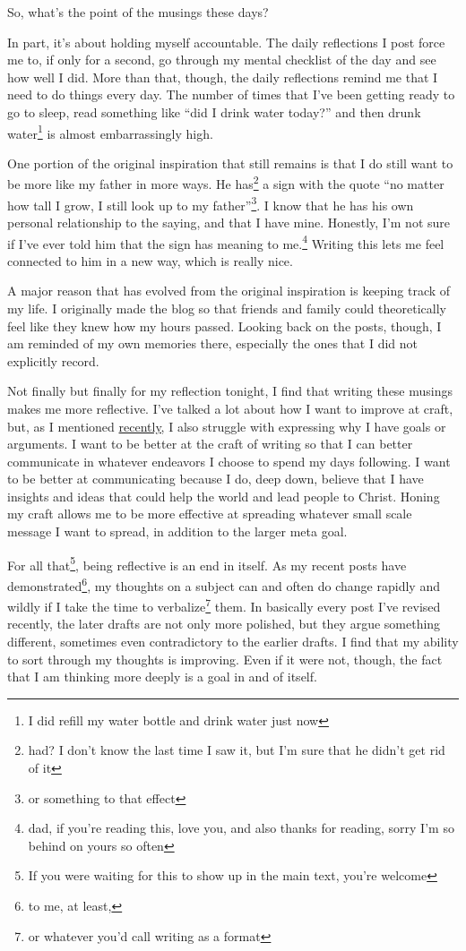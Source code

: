 \documentclass[12pt]{article}[titlepage]
\newcommand{\say}[1]{``#1''}
\newcommand{\1}{\={a}}
\newcommand{\2}{\={e}}
\newcommand{\3}{\={\i}}
\newcommand{\4}{\=o}
\newcommand{\5}{\=u}
\newcommand{\6}{\={A}}
\renewcommand{\,}{\textsuperscript{,}}
\begin{document}
So, what's the point of the musings these days?

In part, it's about holding myself accountable.
The daily reflections I post force me to, if only for a second, go through my mental checklist of the day and see how well I did.
More than that, though, the daily reflections remind me that I need to do things every day.
The number of times that I've been getting ready to go to sleep, read something like \say{did I drink water today?} and then drunk water\footnote{I did refill my water bottle and drink water just now} is almost embarrassingly high.

One portion of the original inspiration that still remains is that I do still want to be more like my father in more ways.
He has\footnote{had? I don't know the last time I saw it, but I'm sure that he didn't get rid of it} a sign with the quote \say{no matter how tall I grow, I still look up to my father}\footnote{or something to that effect}.
I know that he has his own personal relationship to the saying, and that I have mine.
Honestly, I'm not sure if I've ever told him that the sign has meaning to me.\footnote{dad, if you're reading this, love you, and also thanks for reading, sorry I'm so behind on yours so often}
Writing this lets me feel connected to him in a new way, which is really nice.

A major reason that has evolved from the original inspiration is keeping track of my life.
I originally made the blog so that friends and family could theoretically feel like they knew how my hours passed.
Looking back on the posts, though, I am reminded of my own memories there, especially the ones that I did not explicitly record.

Not finally but finally for my reflection tonight, I find that writing these musings makes me more reflective.
I've talked a lot about how I want to improve at craft, but, as I mentioned \href{conclusions.html}{recently,} I also struggle with expressing why I have goals or arguments.
I want to be better at the craft of writing so that I can better communicate in whatever endeavors I choose to spend my days following.
I want to be better at communicating because I do, deep down, believe that I have insights and ideas that could help the world and lead people to Christ.
Honing my craft allows me to be more effective at spreading whatever small scale message I want to spread, in addition to the larger meta goal.

For all that\footnote{If you were waiting for this to show up in the main text, you're welcome}, being reflective is an end in itself.
As my recent posts have demonstrated\footnote{to me, at least,}, my thoughts on a subject can and often do change rapidly and wildly if I take the time to verbalize\footnote{or whatever you'd call writing as a format} them.
In basically every post I've revised recently, the later drafts are not only more polished, but they argue something different, sometimes even contradictory to the earlier drafts.
I find that my ability to sort through my thoughts is improving.
Even if it were not, though, the fact that I am thinking more deeply is a goal in and of itself.
\end{document}
